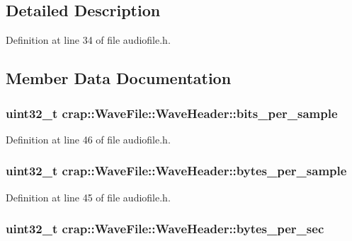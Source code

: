 \subsection{Detailed Description}


Definition at line 34 of file audiofile.\+h.



\subsection{Member Data Documentation}
\hypertarget{structcrap_1_1_wave_file_1_1_wave_header_a1d2dfb13f8420ff85379876e921377bc}{
\subsubsection[{bits\+\_\+per\+\_\+sample}]{\setlength{\rightskip}{0pt plus 5cm}uint32\+\_\+t crap\+::\+Wave\+File\+::\+Wave\+Header\+::bits\+\_\+per\+\_\+sample}}\label{structcrap_1_1_wave_file_1_1_wave_header_a1d2dfb13f8420ff85379876e921377bc}


Definition at line 46 of file audiofile.\+h.

\hypertarget{structcrap_1_1_wave_file_1_1_wave_header_a107e3836f3150d03a2a9cb6d90d0bd4e}{
\subsubsection[{bytes\+\_\+per\+\_\+sample}]{\setlength{\rightskip}{0pt plus 5cm}uint32\+\_\+t crap\+::\+Wave\+File\+::\+Wave\+Header\+::bytes\+\_\+per\+\_\+sample}}\label{structcrap_1_1_wave_file_1_1_wave_header_a107e3836f3150d03a2a9cb6d90d0bd4e}


Definition at line 45 of file audiofile.\+h.

\hypertarget{structcrap_1_1_wave_file_1_1_wave_header_a3646f53398f2436d4ca44a9ba40fff46}{
\subsubsection[{bytes\+\_\+per\+\_\+sec}]{\setlength{\rightskip}{0pt plus 5cm}uint32\+\_\+t crap\+::\+Wave\+File\+::\+Wave\+Header\+::bytes\+\_\+per\+\_\+sec}}\label{structcrap_1_1_wave_file_1_1_wave_header_a3646f53398f2436d4ca44a9ba40fff46}


